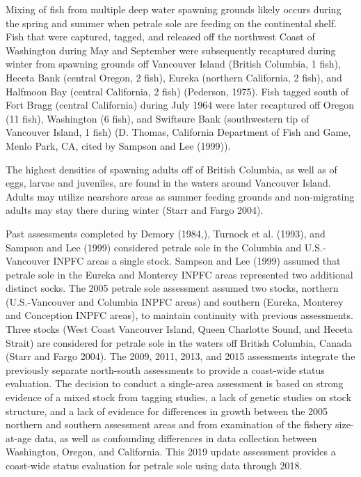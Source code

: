 \documentclass[11pt,
  english,
  letterpaper,
]{article}
\begin{document}
Mixing of fish from multiple deep water spawning grounds likely occurs during the spring and summer when petrale sole are feeding on the continental shelf. Fish that were captured, tagged, and released off the northwest Coast of Washington during May and September were subsequently recaptured during winter from spawning grounds off Vancouver Island (British Columbia, 1 fish), Heceta Bank (central Oregon, 2 fish), Eureka (northern California, 2 fish), and Halfmoon Bay (central California, 2 fish) (Pederson, 1975). Fish tagged south of Fort Bragg (central California) during July 1964 were later recaptured off Oregon (11 fish), Washington (6 fish), and Swiftsure Bank (southwestern tip of Vancouver Island, 1 fish) (D. Thomas, California Department of Fish and Game, Menlo Park, CA, cited by Sampson and Lee (1999)).

The highest densities of spawning adults off of British Columbia, as well as of eggs, larvae and juveniles, are found in the waters around Vancouver Island. Adults may utilize nearshore areas as summer feeding grounds and non-migrating adults may stay there during winter (Starr and Fargo 2004).

Past assessments completed by Demory (1984,), Turnock et al. (1993), and Sampson and Lee (1999) considered petrale sole in the Columbia and U.S.-Vancouver INPFC areas a single stock. Sampson and Lee (1999) assumed that petrale sole in the Eureka and Monterey INPFC areas represented two additional distinct socks. The 2005 petrale sole assessment assumed two stocks, northern (U.S.-Vancouver and Columbia INPFC areas) and southern (Eureka, Monterey and Conception INPFC areas), to maintain continuity with previous assessments. Three stocks (West Coast Vancouver Island, Queen Charlotte Sound, and Heceta Strait) are considered for petrale sole in the waters off British Columbia, Canada (Starr and Fargo 2004). The 2009, 2011, 2013, and 2015 assessments integrate the previously separate north-south assessments to provide a coast-wide status evaluation. The decision to conduct a single-area assessment is based on strong evidence of a mixed stock from tagging studies, a lack of genetic studies on stock structure, and a lack of evidence for differences in growth between the 2005 northern and southern assessment areas and from examination of the fishery size-at-age data, as well as confounding differences in data collection between Washington, Oregon, and California. This 2019 update assessment provides a coast-wide status evaluation for petrale sole using data through 2018.
\end{document}
